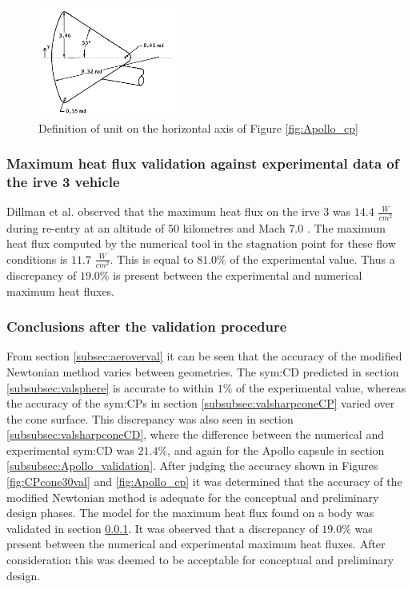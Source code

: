 \begin{figure}[H]
	\centering
	\includegraphics[width=0.4\textwidth]{./Figure/Apollo_model}
	\caption{Definition of unit on the horizontal axis of Figure \ref{fig:Apollo_cp} \cite{Bertin1966}}
	\label{fig:Apollo_y}
\end{figure}

\subsubsection{Maximum heat flux validation against experimental data of the \gls{irve} 3 vehicle}
\label{subsubsec:heatvalidation}
Dillman et al. observed that the maximum heat flux on the \acrfull{irve} 3 was $14.4$ $\frac{W}{cm^{2}}$ during re-entry at an altitude of $50$ kilometres and Mach $7.0$ \cite{Dillman2012}. The maximum heat flux computed by the numerical tool in the stagnation point for these flow conditions is $11.7$ $\frac{W}{cm^{2}}$. This is equal to $81.0\%$ of the experimental value. Thus a discrepancy of $19.0\%$ is present between the experimental and numerical maximum heat fluxes.

\subsubsection{Conclusions after the validation procedure}
\label{subsec:validconclusions}
From section \ref{subsec:aeroverval} it can be seen that the accuracy of the modified Newtonian method varies between geometries. The \gls{sym:CD} predicted in section \ref{subsubsec:valsphere} is accurate to within $1\%$ of the experimental value, whereas the accuracy of the \glspl{sym:CP} in section \ref{subsubsec:valsharpconeCP} varied over the cone surface. This discrepancy was also seen in section \ref{subsubsec:valsharpconeCD}, where the difference between the numerical and experimental \gls{sym:CD} was $21.4\%$, and again for the Apollo capsule in section \ref{subsubsec:Apollo_validation}. After judging the accuracy shown in Figures \ref{fig:CPcone30val} and \ref{fig:Apollo_cp} it was determined that the accuracy of the modified Newtonian method is adequate for the conceptual and preliminary design phases.
The model for the maximum heat flux found on a body was validated in section \ref{subsubsec:heatvalidation}. It was observed that a discrepancy of $19.0\%$ was present between the numerical and experimental maximum heat fluxes. After consideration this was deemed to be acceptable for conceptual and preliminary design.

